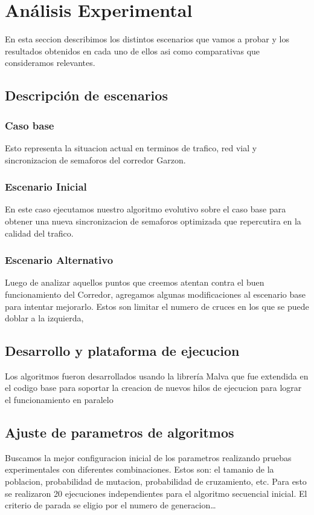 \chapter{Análisis Experimental}
En esta seccion describimos los distintos escenarios que vamos a probar y los resultados obtenidos en cada uno de ellos asi como comparativas que consideramos relevantes.

\section{Descripción de escenarios}

\subsection{Caso base}
Esto representa la situacion actual en terminos de trafico, red vial y sincronizacion de semaforos del corredor Garzon. 

\subsection{Escenario Inicial }
En este caso ejecutamos nuestro algoritmo evolutivo sobre el caso base para obtener una nueva sincronizacion de semaforos optimizada que repercutira en la calidad del trafico.

\subsection{Escenario Alternativo}
Luego de analizar aquellos puntos que creemos atentan contra el buen funcionamiento del Corredor, agregamos algunas modificaciones al escenario base para intentar mejorarlo. 
Estos son limitar el numero de cruces en los que se puede doblar a la izquierda, 



\section{Desarrollo y plataforma de ejecucion }
Los algoritmos fueron desarrollados usando la librería Malva que fue extendida en el codigo base para soportar la creacion de nuevos hilos de ejecucion para lograr el funcionamiento en paralelo

\section{Ajuste de parametros de algoritmos}
Buscamos la mejor configuracion inicial de los parametros realizando pruebas experimentales con diferentes combinaciones.  Estos son: el tamanio de la poblacion,  probabilidad de mutacion, probabilidad de cruzamiento, etc.
Para esto se realizaron 20 ejecuciones independientes para el algoritmo secuencial inicial.
El criterio de parada se eligio por el numero de generacion…

